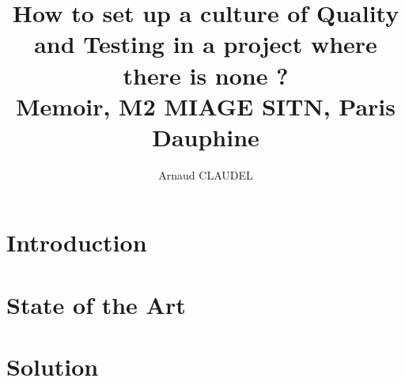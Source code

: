 \documentclass{report}
\title{
How to set up a culture of Quality and Testing in a project where there is none ?
\\ {\large Memoir, M2 MIAGE SITN, Paris Dauphine}}
\author{Arnaud CLAUDEL}
\begin{document}
    \maketitle
    \tableofcontents

    \chapter{Introduction}\label{ch:introduction}
    

    \chapter{State of the Art}\label{ch:state-of-the-art}
    

    \chapter{Solution}\label{ch:solution}
    
\end{document}

